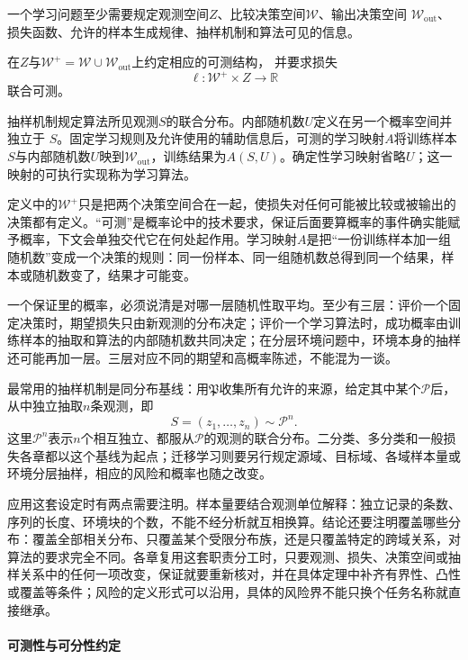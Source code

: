 \begin{definition}[学习问题的形式设定]
\label{def:learning-problem-setting}
一个学习问题至少需要规定观测空间$Z$、比较决策空间$\mathcal W$、输出决策空间
$\mathcal W_{\mathrm{out}}$、损失函数、允许的样本生成规律、抽样机制和算法可见的信息。

在$Z$与$\mathcal W^+=\mathcal W\cup\mathcal W_{\mathrm{out}}$上约定相应的可测结构，
并要求损失
\[
 \ell:\mathcal W^+\times Z\to\mathbb R
\]
联合可测。

抽样机制规定算法所见观测$S$的联合分布。内部随机数$U$定义在另一个概率空间并独立于
$S$。固定学习规则及允许使用的辅助信息后，可测的学习映射$A$将训练样本$S$与内部随机数$U$映到$\mathcal W_{\mathrm{out}}$，训练结果为$A(S,U)$。确定性学习映射省略$U$；这一映射的可执行实现称为学习算法。
\end{definition}

定义中的$\mathcal W^+$只是把两个决策空间合在一起，使损失对任何可能被比较或被输出的决策都有定义。“可测”是概率论中的技术要求，保证后面要算概率的事件确实能赋予概率，下文会单独交代它在何处起作用。学习映射$A$是把“一份训练样本加一组随机数”变成一个决策的规则：同一份样本、同一组随机数总得到同一个结果，样本或随机数变了，结果才可能变。

一个保证里的概率，必须说清是对哪一层随机性取平均。至少有三层：评价一个固定决策时，期望损失只由新观测的分布决定；评价一个学习算法时，成功概率由训练样本的抽取和算法的内部随机数共同决定；在分层环境问题中，环境本身的抽样还可能再加一层。三层对应不同的期望和高概率陈述，不能混为一谈。

最常用的抽样机制是同分布基线：用$\mathfrak P$收集所有允许的来源，给定其中某个$\mathcal P$后，从中独立抽取$n$条观测，即
\[
 S=(z_1,\ldots,z_n)\sim\mathcal P^n.
\]
这里$\mathcal P^n$表示$n$个相互独立、都服从$\mathcal P$的观测的联合分布。二分类、多分类和一般损失各章都以这个基线为起点；迁移学习则要另行规定源域、目标域、各域样本量或环境分层抽样，相应的风险和概率也随之改变。

应用这套设定时有两点需要注明。样本量要结合观测单位解释：独立记录的条数、序列的长度、环境块的个数，不能不经分析就互相换算。结论还要注明覆盖哪些分布：覆盖全部相关分布、只覆盖某个受限分布族，还是只覆盖特定的跨域关系，对算法的要求完全不同。各章复用这套职责分工时，只要观测、损失、决策空间或抽样关系中的任何一项改变，保证就要重新核对，并在具体定理中补齐有界性、凸性或覆盖等条件；风险的定义形式可以沿用，具体的风险界不能只换个任务名称就直接继承。

\paragraph{可测性与可分性约定}

